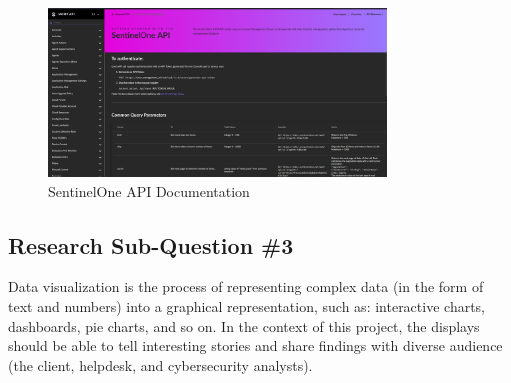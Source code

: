 \begin{figure}[htbp]
      \centering
      \includegraphics[width=0.8\textwidth]{Figures/SentinelOne/API Doc.png}
      \caption{SentinelOne API Documentation}
\end{figure}

\begin{multicols}{2}
      \section{Research Sub-Question \#3}
      Data visualization is the process of representing complex data (in the form of text and numbers) into a graphical representation,
      such as: interactive charts, dashboards, pie charts, and so on. In the context of this project, the displays should be able to tell
      interesting stories and share findings with diverse audience (the client, helpdesk, and cybersecurity analysts).


\end{multicols}

